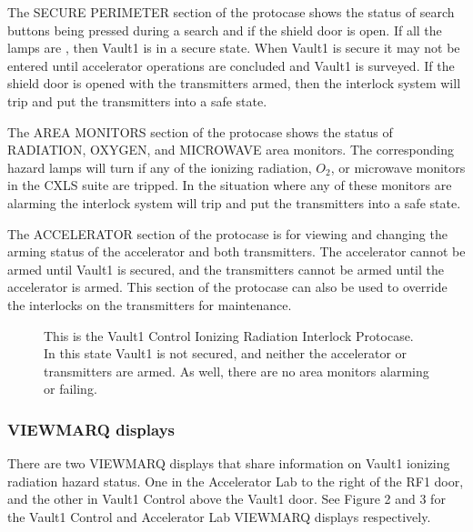 \documentclass[letterpaper,10pt,english]{sphinxmanual}
\begin{document}
\sphinxAtStartPar
The SECURE PERIMETER section of the protocase shows the status of search buttons being pressed during a search and if the shield door is open.
If all the lamps are , then Vault\sphinxhyphen{}1 is in a secure state. When Vault\sphinxhyphen{}1 is secure it may not be entered until accelerator operations are concluded and Vault\sphinxhyphen{}1 is surveyed.
If the shield door is opened with the transmitters armed, then the interlock system will trip and put the transmitters into a safe state.

\sphinxAtStartPar
The AREA MONITORS section of the protocase shows the status of RADIATION, OXYGEN, and MICROWAVE area monitors.
The corresponding hazard lamps will turn  if any of the ionizing radiation, \(O_{2}\), or microwave monitors in the CXLS suite are tripped.
In the situation where any of these monitors are alarming the interlock system will trip and put the transmitters into a safe state.

\sphinxAtStartPar
The ACCELERATOR section of the protocase is for viewing and changing the arming status of the accelerator and both transmitters.
The accelerator cannot be armed until Vault\sphinxhyphen{}1 is secured, and the transmitters cannot be armed until the accelerator is armed.
This section of the protocase can also be used to override the interlocks on the transmitters for maintenance.

\begin{figure}[htbp]
\centering
\capstart

\noindent{}
\caption{ This is the Vault\sphinxhyphen{}1 Control Ionizing Radiation Interlock Protocase. In this state Vault\sphinxhyphen{}1 is not secured, and neither the accelerator or transmitters are armed.
As well, there are no area monitors alarming or failing.}\label{\detokenize{user_documentation/Vault-1_ionizing_radiation:id1}}\end{figure}


\subsubsection{VIEWMARQ displays}
\label{\detokenize{user_documentation/Vault-1_ionizing_radiation:viewmarq-displays}}
\sphinxAtStartPar
There are two VIEWMARQ displays that share information on Vault\sphinxhyphen{}1 ionizing radiation hazard status.
One in the Accelerator Lab to the right of the RF\sphinxhyphen{}1 door, and the other in Vault\sphinxhyphen{}1 Control above the Vault\sphinxhyphen{}1 door.
See Figure 2 and 3 for the Vault\sphinxhyphen{}1 Control and Accelerator Lab VIEWMARQ displays respectively.
\end{document}
